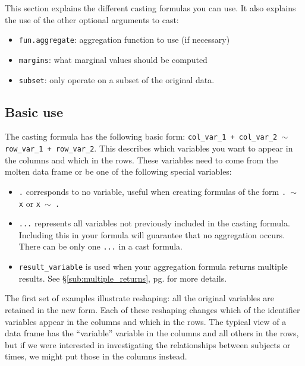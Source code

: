\documentclass[oneside,letterpaper]{scrartcl}
\newcommand{\secref}[1]{\S \ref{#1}, pg. \pageref{#1}}
\begin{document}
This section explains the different casting formulas you can use.  It also explains the use of the other optional arguments to cast:

\begin{itemize}
	\item {\tt fun.aggregate}: aggregation function to use (if necessary)
	\item {\tt margins}: what marginal values should be computed
	\item {\tt subset}: only operate on a subset of the original data.
\end{itemize}

\subsection{Basic use}\label{sub:basic_use}

The casting formula has the following basic form: {\tt col\_var\_1 +  col\_var\_2 $\sim$ row\_var\_1 + row\_var\_2}.  This describes which variables you want to appear in the columns and which in the rows.  These variables need to come from the molten data frame or be one of the following special variables:

\begin{itemize}
	\item {\tt .} corresponds to no variable, useful when creating formulas of the form {\tt .\ $\sim$ x} or {\tt x $\sim$ .}
	\item {\tt ...} represents all variables not previously included in the casting formula.  Including this in your formula will guarantee that no aggregation occurs.  There can be only one {\tt ...} in a cast formula.
	\item {\tt result\_variable} is used when your aggregation formula returns multiple results.  See \secref{sub:multiple_returns} for more details.
\end{itemize}

The first set of examples illustrate reshaping: all the original variables are retained in the new form.  Each of these reshaping changes which of the identifier variables appear in the columns and which in the rows.  The typical view of a data frame has the ``variable'' variable in the columns and all others in the rows, but if we were interested in investigating the relationships between subjects or times, we might put those in the columns instead.
\end{document}
